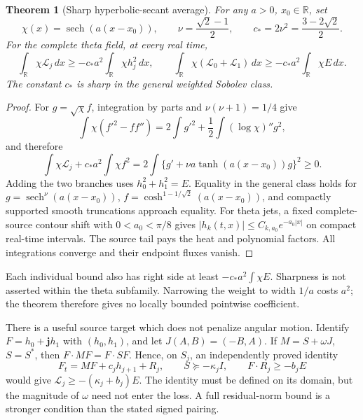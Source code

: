 \documentclass[11pt]{article}
\numberwithin{equation}{section}
\newtheorem{theorem}{Theorem}[section]
\theoremstyle{definition}
\theoremstyle{remark}
\newcommand{\R}{\mathbb R}
\newcommand{\jj}{\mathbf j}
\newcommand{\dd}{\,d}
\newcommand{\Lag}{\mathcal L}
\begin{document}
\begin{theorem}[Sharp hyperbolic-secant average]
\label{sf:sech}
For any \(a>0\), \(x_0\in\R\), set
\[
 \chi(x)=\operatorname{sech}(a(x-x_0)),\qquad
 \nu=\frac{\sqrt2-1}{2},\qquad c_*=2\nu^2=\frac{3-2\sqrt2}{2}.
\]
For the complete theta field, at every real time,
\begin{equation}
 \int_{\R}\chi\Lag_j\dd x
       \ge-c_*a^2\int_{\R}\chi h_j^2\dd x,\qquad
 \int_{\R}\chi(\Lag_0+\Lag_1)\dd x
       \ge-c_*a^2\int_{\R}\chi E\dd x .
 \label{sf:sech-bound}
\end{equation}
The constant \(c_*\) is sharp in the general weighted Sobolev class.
\end{theorem}
\begin{proof}
For \(g=\sqrt\chi f\), integration by parts and
\(\nu(\nu+1)=1/4\) give
\[
 \int\chi(f'^2-ff'')=
 2\int g'^2+\frac12\int(\log\chi)''g^2,
\]
and therefore
\begin{equation}
 \int\chi\Lag_j+c_*a^2\int\chi f^2
   =2\int\{g'+\nu a\tanh(a(x-x_0))g\}^2\ge0 .
 \label{sf:sech-square}
\end{equation}
Adding the two branches uses \(h_0^2+h_1^2=E\).
Equality in the general class holds for
\(g=\operatorname{sech}^{\nu}(a(x-x_0))\),
\(f=\cosh^{1-1/\sqrt2}(a(x-x_0))\), and compactly supported smooth
truncations approach equality.  For theta jets, a fixed complete-source
contour shift with \(0<a_0<\pi/8\) gives
\(|h_k(t,x)|\le C_{k,a_0}e^{-a_0|x|}\) on compact real-time
intervals.  The source tail pays the heat and polynomial factors.
All integrations converge and their endpoint fluxes vanish.
\end{proof}
Each individual bound also has right side at least
\(-c_*a^2\int\chi E\).  Sharpness is not asserted within the theta
subfamily.  Narrowing the weight to width \(1/a\) costs \(a^2\);
the theorem therefore gives no locally bounded pointwise coefficient.

There is a useful source target which does not penalize angular
motion.  Identify \(F=h_0+\jj h_1\) with \((h_0,h_1)\), and let
\(J(A,B)=(-B,A)\).  If \(M=S+\omega J\), \(S=S^*\), then
\(F\cdot MF=F\cdot SF\).  Hence, on \(S_j\), an independently proved
identity
\[
 F_t=MF+c_jh_{j+1}+R_j,\qquad
 S\succeq-\kappa_jI,\qquad F\cdot R_j\ge-b_jE
\]
would give \(\Lag_j\ge-(\kappa_j+b_j)E\).
The identity must be defined on its domain, but the magnitude of
\(\omega\) need not enter the loss.  A full residual-norm bound is
a stronger condition than the stated signed pairing.
\end{document}
